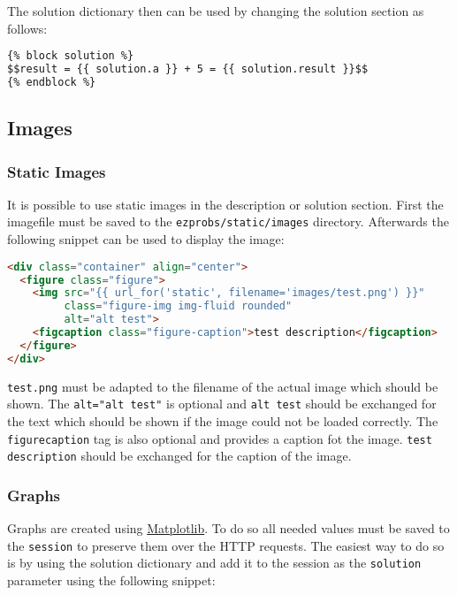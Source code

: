 The solution dictionary then can be used by changing the solution section as follows:

\begin{lstlisting}[language=html]
{% block solution %}
$$result = {{ solution.a }} + 5 = {{ solution.result }}$$
{% endblock %}
\end{lstlisting}

\subsection{Images}

\subsubsection{Static Images}

It is possible to use static images in the description or solution section.
First the imagefile must be saved to the \verb+ezprobs/static/images+
directory. Afterwards the following snippet can be used to display the image:

\begin{lstlisting}[language=html]
<div class="container" align="center">
  <figure class="figure">
    <img src="{{ url_for('static', filename='images/test.png') }}"
         class="figure-img img-fluid rounded"
         alt="alt test">
    <figcaption class="figure-caption">test description</figcaption>
  </figure>
</div>
\end{lstlisting}

\verb+test.png+ must be adapted to the filename of the actual image which
should be shown. The \verb+alt="alt test"+ is optional and \verb+alt test+
should be exchanged for the text which should be shown if the image could not
be loaded correctly. The \verb+figurecaption+ tag is also optional and provides
a caption fot the image. \verb+test description+ should be exchanged for the
caption of the image.

\subsubsection{Graphs}

Graphs are created using \href{https://matplotlib.org/}{Matplotlib}. To do so
all needed values must be saved to the \verb+session+ to preserve them over the
HTTP requests. The easiest way to do so is by using the solution dictionary and
add it to the session as the \verb+solution+ parameter using the following snippet:

